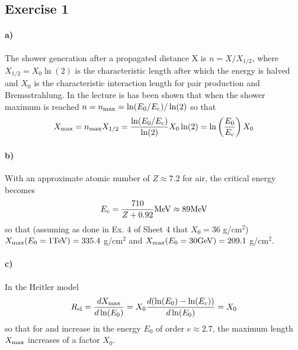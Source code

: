 \documentclass{article}
\author{Matteo Lucca \& Thorben Finke}
\title{}
\date{}
\begin{document}
\subsection*{Exercise 1}
\paragraph{a)} The shower generation after a propagated distance X is $n=X/X_{1/2}$, where $X_{1/2}=X_0 \ln(2)$ is the characteristic length after which the energy is halved and $X_0$ is the characteristic interaction length for pair production and Bremsstrahlung. In the lecture is has been shown that when the shower maximum is reached $n=n_{\rm max}=\ln(E_0/E_{\rm c})/\ln(2)$ so that
\begin{align}
X_{\rm max}=n_{\rm max}X_{1/2}=\frac{\ln(E_0/E_{\rm c})}{\ln(2)}X_0\ln(2)=\ln\left(\frac{E_0}{E_{\rm c}}\right)X_0
\end{align}

\paragraph{b)} With an approximate atomic number of $Z\approx 7.2$ for air, the critical energy becomes
\begin{align}
E_c=\frac{710}{Z+0.92} {\rm MeV}\approx 89  {\rm MeV}
\end{align}
so that (assuming as done in Ex. 4 of Sheet 4 that $X_0=36$ g/cm$^2$) $X_{\rm max}(E_0=1{\rm TeV})=335.4$ g/cm$^2$ and $X_{\rm max}(E_0=30{\rm GeV})=209.1$ g/cm$^2$.

\paragraph{c)}
In the Heitler model 
\begin{align}
R_{\rm el}=\frac{dX_{\rm max}}{d\ln(E_0)}=X_0\frac{d(\ln(E_0)-\ln(E_c))}{d\ln(E_0)}=X_0
\end{align}
so that for and increase in the energy $E_0$ of order $e\approx 2.7$, the maximum length $X_{\rm max}$ increases of a factor $X_0$.
\end{document}
